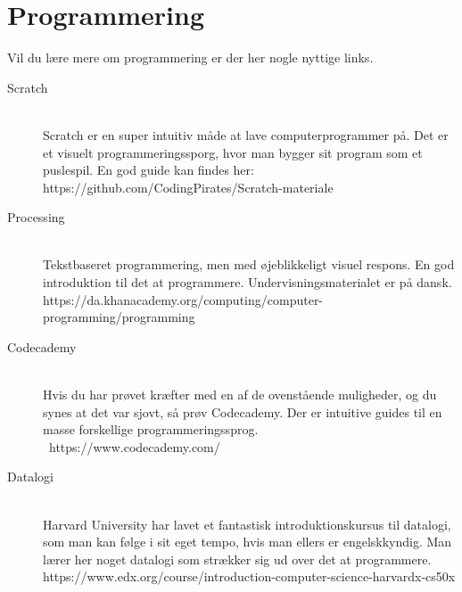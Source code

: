 \documentclass[11pt]{article}
\begin{document}
\section{Programmering}
Vil du lære mere om programmering er der her nogle nyttige links.
\begin{description}
    \item[Scratch]~\\
        Scratch er en super intuitiv måde at lave computerprogrammer på. Det er et visuelt programmeringssporg, hvor man bygger sit program som et puslespil. En god guide kan findes her: https://github.com/CodingPirates/Scratch-materiale
    \item[Processing]~\\
        Tekstbaseret programmering, men med øjeblikkeligt visuel respons. En god introduktion til det at programmere. Undervisningsmaterialet er på dansk. \\
        https://da.khanacademy.org/computing/computer-programming/programming
    \item[Codecademy]~\\
        Hvis du har prøvet kræfter med en af de ovenstående muligheder, og du synes at det var sjovt, så prøv Codecademy. Der er intuitive guides til en masse forskellige programmeringssprog. \\ https://www.codecademy.com/
    \item[Datalogi]~\\
        Harvard University har lavet et fantastisk introduktionskursus til datalogi, som man kan følge i sit eget tempo, hvis man ellers er engelskkyndig. Man lærer her noget datalogi som strækker sig ud over det at programmere. \\
        https://www.edx.org/course/introduction-computer-science-harvardx-cs50x

\end{description}
\end{document}
